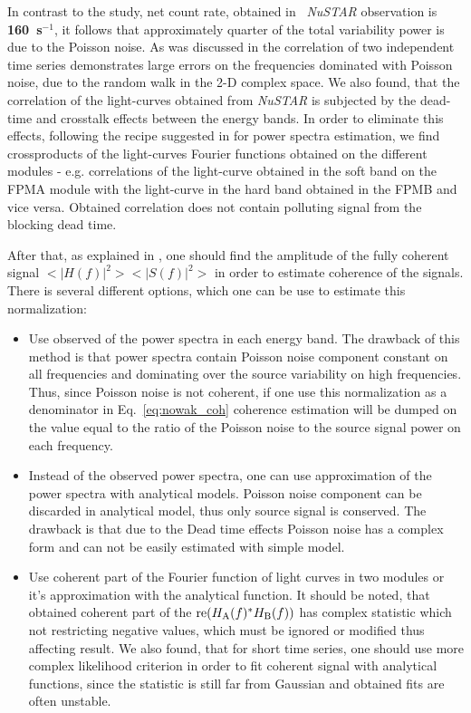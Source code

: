 In contrast to the \citep{nowak99} study, net count rate, obtained in \grs\ {\it NuSTAR} observation is {\bf 160~s$^{-1}$}, it follows that approximately quarter of the total variability power is due to the Poisson noise. 
As was discussed in \citep{nowak99} the correlation of two independent time series demonstrates large errors on the frequencies dominated with Poisson noise, due to the random walk in the 2-D complex space.
We also found, that the correlation of the light-curves obtained from {\it NuSTAR} is subjected by the dead-time and crosstalk effects between the energy bands.
In order to eliminate this effects, following the recipe suggested in \cite{2015ApJ...800..109B} for power spectra estimation, we find crossproducts of the light-curves Fourier functions obtained on the different modules - e.g. correlations of the light-curve obtained in the soft band on the FPMA module with the light-curve in the hard band obtained in the FPMB and vice versa.
Obtained correlation does not contain polluting signal from the blocking dead time. 

After that, as explained in \citep{Nowak99}, one should find the amplitude of the fully coherent signal $<|H(f)|^2><|S(f)|^2>$ in order to estimate coherence of the signals. 
There is several different options, which one can be use to estimate this normalization:
\begin{itemize}
        \item Use observed of the power spectra in each energy band. 
                The drawback of this method is that power spectra contain Poisson noise component constant on all frequencies and dominating over the source variability on high frequencies. 
                Thus, since Poisson noise is not coherent,  if one use this normalization as a denominator in Eq.~\ref{eq:nowak_coh} coherence estimation will be dumped on the value equal to the ratio of the Poisson noise to the source signal power on each frequency.
        \item Instead of the observed power spectra, one can use approximation of the power spectra with analytical models. 
                Poisson noise component can be discarded in analytical model, thus only source signal is conserved. 
                The drawback is that due to the Dead time effects Poisson noise has a complex form and can not be easily estimated with simple model.
        \item Use coherent part of the Fourier function of light curves in two modules \citep{2015ApJ...800..109B} or it's approximation with the analytical function. 
                It should be noted, that obtained coherent part of the ${\rm re}(H_{\rm A}(f)^*H_{\rm B}(f))$ has complex statistic which not restricting negative values, which must be ignored or modified thus affecting result.  
                We also found, that for short time series, one should use more complex likelihood criterion in order to fit coherent signal with analytical functions, since the statistic is still far from Gaussian and obtained fits are often unstable.
\end{itemize}

